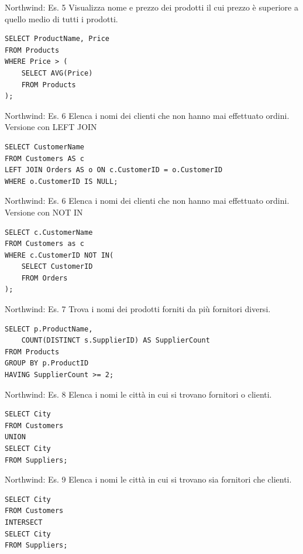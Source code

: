 %
\begin{frame}[fragile]{Northwind: Es. 5}
Visualizza nome e prezzo dei prodotti il cui prezzo \`e superiore a quello medio di tutti i prodotti.
\pause
\begin{lstlisting}
SELECT ProductName, Price
FROM Products
WHERE Price > (
    SELECT AVG(Price)
    FROM Products
);
\end{lstlisting}
\end{frame}
%
\begin{frame}[fragile]{Northwind: Es. 6}
Elenca i nomi dei clienti che non hanno mai effettuato ordini.
\pause
\newline
\newline
Versione con LEFT JOIN
\begin{lstlisting}
SELECT CustomerName
FROM Customers AS c
LEFT JOIN Orders AS o ON c.CustomerID = o.CustomerID
WHERE o.CustomerID IS NULL;
\end{lstlisting}
\end{frame}

\begin{frame}[fragile]{Northwind: Es. 6}
Elenca i nomi dei clienti che non hanno mai effettuato ordini.
\newline
\newline
Versione con NOT IN
\begin{lstlisting}
SELECT c.CustomerName
FROM Customers as c
WHERE c.CustomerID NOT IN(
	SELECT CustomerID
	FROM Orders
);
\end{lstlisting}
\end{frame}
%
\begin{frame}[fragile]{Northwind: Es. 7}
Trova i nomi dei prodotti forniti da pi\`u fornitori diversi.
\pause
\begin{lstlisting}
SELECT p.ProductName, 
    COUNT(DISTINCT s.SupplierID) AS SupplierCount
FROM Products
GROUP BY p.ProductID
HAVING SupplierCount >= 2;
\end{lstlisting}
\end{frame}
%
\begin{frame}[fragile]{Northwind: Es. 8}
Elenca i nomi le citt\`a in cui si trovano fornitori o clienti.
\pause
\begin{lstlisting}
SELECT City
FROM Customers
UNION
SELECT City
FROM Suppliers;
\end{lstlisting}
\end{frame}
%
\begin{frame}[fragile]{Northwind: Es. 9}
Elenca i nomi le citt\`a in cui si trovano sia fornitori che clienti.
\pause
\begin{lstlisting}
SELECT City
FROM Customers
INTERSECT
SELECT City
FROM Suppliers;
\end{lstlisting}
\end{frame}

